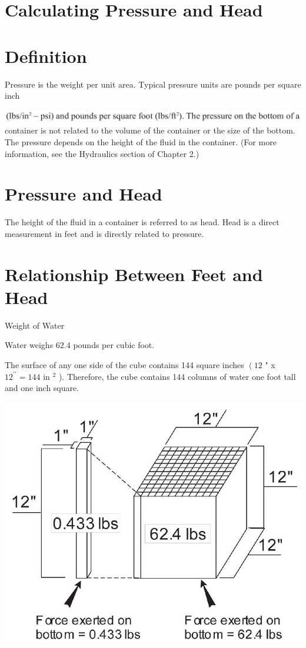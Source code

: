 \documentclass[10pt]{article}
\begin{document}
\section{Calculating Pressure and Head}
\section{Definition}
Pressure is the weight per unit area. Typical pressure units are pounds per square inch

\includegraphics[max width=\textwidth]{2022_09_11_72dbedc910e6e984560cg-41(1)}\\
container is not related to the volume of the container or the size of the bottom. The pressure depends on the height of the fluid in the container. (For more information, see the Hydraulics section of Chapter 2.)

\section{Pressure and Head}
The height of the fluid in a container is referred to as head. Head is a direct measurement in feet and is directly related to pressure.

\section{Relationship Between Feet and Head}
Weight of Water

Water weighs $62.4$ pounds per cubic foot.

The surface of any one side of the cube contains 144 square inches $\left(12\right.$ " x $12^{\prime \prime}=144$ in $^{2}$ ). Therefore, the cube contains 144 columns of water one foot tall and one inch square.

\includegraphics[max width=\textwidth]{2022_09_11_72dbedc910e6e984560cg-42}
\end{document}
